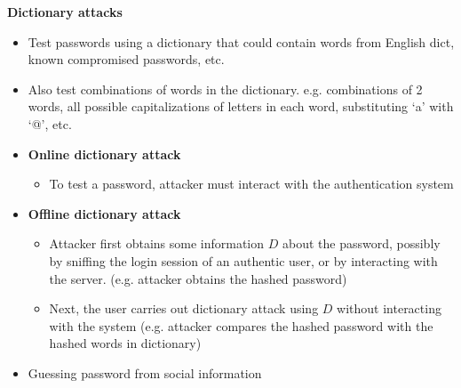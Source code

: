 \documentclass[landscape,a4paper]{extarticle}
\begin{document}
\begin{multicols*}{5}
    \textbf{Dictionary attacks}
    \begin{itemize}
        \item Test passwords using a dictionary that could contain words from English dict, known
        compromised passwords, etc.
        \item Also test combinations of words in the dictionary. e.g. combinations of 2 words, all possible capitalizations
        of letters in each word, substituting `a' with `@', etc.
        \item \textbf{Online dictionary attack}
        \begin{itemize}
            \item To test a password, attacker must interact with the authentication system
        \end{itemize}
        \item \textbf{Offline dictionary attack}
        \begin{itemize}
            \item Attacker first obtains some information $D$ about the password, possibly by sniffing the login session
            of an authentic user, or by interacting with the server. (e.g. attacker obtains the hashed password)
            \item Next, the user carries out dictionary attack using $D$ without interacting with the system (e.g. attacker
            compares the hashed password with the hashed words in dictionary)
        \end{itemize}
        \item Guessing password from social information
    \end{itemize}


\end{multicols*}
\end{document}
